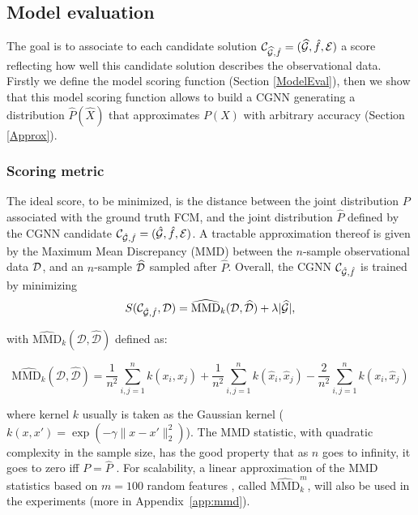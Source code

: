 \documentclass[a4paper, 11pt]{article}
\begin{document}
\subsection{Model evaluation \label{ModelEval}}

The goal is to associate to each candidate solution $\mathcal{C}_{\widehat{\mathcal{G}},\hat{f}} = (\widehat{\mathcal{G}}, \hat{f}, {\cal E})$ a score reflecting how well this candidate solution describes the observational data. 
Firstly we define the model scoring function  (Section \ref{ModelEval}), then we show that this model scoring function allows to build a CGNN generating a distribution $\hat{P}(\hat{X})$ that approximates $P(X)$ with arbitrary accuracy (Section \ref{Approx}).



\subsubsection{Scoring metric \label{ScoringMetric}}

The ideal score, to be minimized, is the distance between the joint distribution $P$ associated with the ground truth FCM, and the joint distribution $\widehat{P}$ defined by the CGNN candidate $\mathcal{C}_{\hat{\cal G},\hat{f}} = (\hat{\cal G}, \hat{f}, {\cal E})$. A tractable approximation thereof is given by the Maximum Mean Discrepancy (MMD) \citep{gretton2007kernel} between the $n$-sample observational data $\cal D$, and an $n$-sample $\widehat{\cal D}$ sampled after $\widehat{P}$. Overall, the CGNN $\mathcal{C}_{\hat{\cal G},\hat{f}}$ is trained by minimizing   
\begin{equation}
  S(\mathcal{C}_{\hat{\cal G},\hat{f}}, \mathcal{D}) =
   \widehat{\text{MMD}}_k(\mathcal{D}, \widehat{\mathcal{D}}) + \lambda 
    |\widehat{\mathcal{G}}|,
  \label{eq:the_loss}
\end{equation}

with $\widehat{\text{MMD}}_k(\mathcal{D}, \widehat{\mathcal{D}})$ defined as:

\begin{equation}
\widehat{\text{MMD}_k}(\mathcal{D}, \widehat{\mathcal{D}}) = 
\frac{1}{n^2} \sum_{i, j = 1}^{n} k(x_i, x_j) +
\frac{1}{n^2} \sum_{i, j = 1}^{n} k(\hat{x}_i, \hat{x}_j)
- \frac{2}{n^2} \sum_{i,j = 1}^n k(x_i, \hat{x}_j)
\label{eq:mmd}
\end{equation}


\noindent where kernel $k$ usually is taken as the Gaussian kernel ($k(x,x') = \exp(-\gamma \|x-x'\|_2^2)$). The MMD statistic, with quadratic complexity in the sample size, has the good property that as $n$ goes to infinity, it goes to zero iff $P
= \hat{P}$  \citep{gretton2007kernel}. For scalability, a linear approximation of the MMD statistics based on $m=100$ random features \citep{dlp}, 
called $\widehat{\text{MMD}}_k^m$, will also be used in the experiments (more in Appendix~\ref{app:mmd}).
\end{document}
